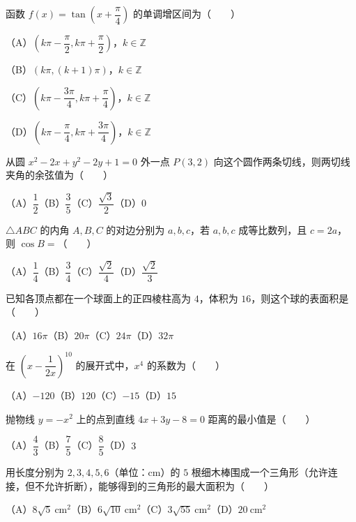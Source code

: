\begin{question}
函数 $f(x)=\tan\left(x+\dfrac\pi4\right)$ 的单调增区间为\mbox{（　　）}

（A）$\left(k\pi-\dfrac\pi2,k\pi+\dfrac\pi2\right)$，$k\in\mathbb Z$

（B）$(k\pi,(k+1)\pi)$，$k\in\mathbb Z$

（C）$\left(k\pi-\dfrac{3\pi}4,k\pi+\dfrac\pi4\right)$，$k\in\mathbb Z$

（D）$\left(k\pi-\dfrac\pi4,k\pi+\dfrac{3\pi}4\right)$，$k\in\mathbb Z$

\end{question}
\begin{question}
从圆 $x^2-2x+y^2-2y+1=0$ 外一点 $P(3,2)$ 向这个圆作两条切线，则两切线夹角的余弦值为\mbox{（　　）}

（A）$\dfrac12$\quad（B）$\dfrac35$\quad（C）$\dfrac{\sqrt3}2$\quad（D）$0$

\end{question}
\begin{question}
$\triangle ABC$ 的内角 $A,B,C$ 的对边分别为 $a,b,c$，若 $a,b,c$ 成等比数列，且 $c=2a$，则 $\cos B=$\mbox{（　　）}

（A）$\dfrac14$\quad（B）$\dfrac34$\quad（C）$\dfrac{\sqrt2}4$\quad（D）$\dfrac{\sqrt2}3$

\end{question}
\begin{question}
已知各顶点都在一个球面上的正四棱柱高为 $4$，体积为 $16$，则这个球的表面积是\mbox{（　　）}

（A）$16\pi$\quad（B）$20\pi$\quad（C）$24\pi$\quad（D）$32\pi$

\end{question}
\begin{question}
在 $\left(x-\dfrac1{2x}\right)^{10}$ 的展开式中，$x^4$ 的系数为\mbox{（　　）}

（A）$-120$\quad（B）$120$\quad（C）$-15$\quad（D）$15$

\end{question}
\begin{question}
抛物线 $y=-x^2$ 上的点到直线 $4x+3y-8=0$ 距离的最小值是\mbox{（　　）}

（A）$\dfrac43$\quad（B）$\dfrac75$\quad（C）$\dfrac85$\quad（D）$3$

\end{question}
\begin{question}
用长度分别为 $2,3,4,5,6$（单位：cm）的 $5$ 根细木棒围成一个三角形（允许连接，但不允许折断），能够得到的三角形的最大面积为\mbox{（　　）}

（A）$8\sqrt5\ \mathrm{cm}^2$\quad（B）$6\sqrt{10}\ \mathrm{cm}^2$\quad（C）$3\sqrt{55}\ \mathrm{cm}^2$\quad（D）$20\ \mathrm{cm}^2$

\end{question}

